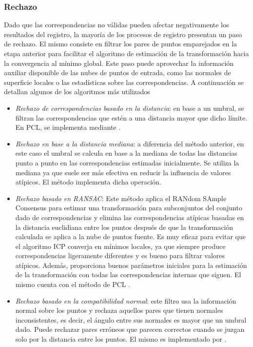 \subsubsection{Rechazo}
Dado que las correspondencias no válidas pueden afectar negativamente los resultados del registro, la mayoría de los procesos de registro presentan un paso de rechazo. El mismo consiste en filtrar los pares de puntos emparejados en la etapa anterior para facilitar el algoritmo de estimación de la transformación hacia la convergencia al mínimo global. Este paso puede aprovechar la información auxiliar disponible de las nubes de puntos de entrada, como las normales de superficie locales o las estadísticas sobre las correspondencias. A continuación se detallan algunos de los algoritmos más utilizados
\begin{itemize}
    \item \textit{Rechazo de correspondencias basado en la distancia}: en base a un umbral, se filtran las correspondencias que estén a una distancia mayor que dicho límite. En PCL, se implementa mediante .
    \item \textit{Rechazo en base a la distancia mediana}: a diferencia del método anterior, en este caso el umbral se calcula en base a la mediana de todas las distancias punto a punto en las correspondencias estimadas inicialmente. Se utiliza la mediana ya que suele ser más efectiva en reducir la influencia de valores atípicos. El método  implementa dicha operación.
    \item \textit{Rechazo basado en RANSAC}: Este método aplica el RANdom SAmple Consensus \cite{fischler1981} para estimar una transformación para subconjuntos del conjunto dado de correspondencias y elimina las correspondencias atípicas basadas en la distancia euclidiana entre los puntos después de que la transformación calculada se aplica a la nube de puntos fuente. Es muy eficaz para evitar que el algoritmo ICP converja en mínimos locales, ya que siempre produce correspondencias ligeramente diferentes y es bueno para filtrar valores atípicos. Además, proporciona buenos parámetros iniciales para la estimación de la transformación con todas las correspondencias internas que siguen. El mismo cuenta con el método de PCL .
    \item \textit{Rechazo basado en la compatibilidad normal}: este filtro usa la información normal sobre los puntos y rechaza aquellos pares que tienen normales inconsistentes, es decir, el ángulo entre sus normales es mayor que un umbral dado. Puede rechazar pares erróneos que parecen correctos cuando se juzgan solo por la distancia entre los puntos. El mismo es implementado por .
\end{itemize}

